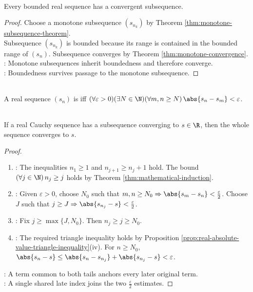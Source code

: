 \begin{theorem} \label{thm:bolzano-weierstrass-real-sequence} \\
Every bounded real sequence has a convergent subsequence.
\begin{proof}
Choose a monotone subsequence $(s_{n_k})$ by Theorem \ref{thm:monotone-subsequence-theorem}.\\
Subsequence $(s_{n_k})$ is bounded because its range is contained in the bounded range of $(s_n)$. Subsequence converges by Theorem \ref{thm:monotone-convergence}.\\
: Monotone subsequences inherit boundedness and therefore converge.\\
: Boundedness survives passage to the monotone subsequence.
\end{proof}
\end{theorem}

\begin{definition} \label{def:real-cauchy-sequence} \\
A real sequence $(s_n)$ is  iff $(\forall\varepsilon>0)(\exists N\in\N)(\forall m,n\geq N)\,\abs{s_n-s_m}<\varepsilon$.
\end{definition}

\begin{lemma} \label{lem:real-cauchy-sequence-with-convergent-subsequence} \\
If a real Cauchy sequence has a subsequence converging to $s\in\R$, then the whole sequence converges to $s$.
\begin{proof}
\begin{enumerate}[label=(\roman*)]
\setlength{\itemsep}{0pt}
\item {}: The inequalities $n_1\geq1$ and $n_{j+1}\geq n_j+1$ hold. The bound $(\forall j\in\N)\,n_j\geq j$ holds by Theorem \ref{thm:mathematical-induction}.
\item {}: Given $\varepsilon>0$, choose $N_0$ such that $m,n\geq N_0\Rightarrow\abs{s_m-s_n}<\frac{\varepsilon}{2}$. Choose $J$ such that $j\geq J\Rightarrow\abs{s_{n_j}-s}<\frac{\varepsilon}{2}$.
\item {}: Fix $j\geq\max\{J,N_0\}$. Then $n_j\geq j\geq N_0$.
\item {}: The required triangle inequality holds by Proposition \ref{prop:real-absolute-value-triangle-inequality}(iv). For $n\geq N_0$, $\abs{s_n-s}\leq\abs{s_n-s_{n_j}}+\abs{s_{n_j}-s}<\varepsilon$.
\end{enumerate}
: A term common to both tails anchors every later original term.\\
: A single shared late index joins the two $\frac{\varepsilon}{2}$ estimates.
\end{proof}
\end{lemma}

